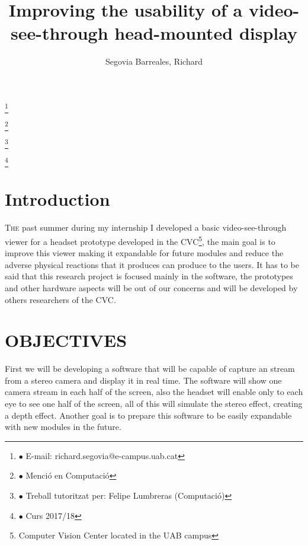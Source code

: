 \documentclass[10pt,a4paper,twocolumn,twoside]{article}
\author{\LARGE\sffamily Segovia Barreales, Richard}
\title{\Huge{\sffamily Improving the usability of a video-see-through head-mounted display}}
\date{}
\newcommand\blfootnote[1]{%
  \begingroup
  \renewcommand\thefootnote{}\footnote{#1}%
  \addtocounter{footnote}{-1}%
  \endgroup
}
\begin{document}
\fancyhead[RO]{\thepage}
\fancyhead[LE]{\thepage}

\fancyfoot[CO,CE]{}

{
   \fancyhf{}
}

\renewcommand{\headrulewidth}{0pt}
\renewcommand{\footrulewidth}{0pt}
\pagestyle{fancy}

\maketitle

\thispagestyle{primerapagina}


\blfootnote{$\bullet$ E-mail: richard.segovia@e-campus.uab.cat}
\blfootnote{$\bullet$ Menció en Computació}
\blfootnote{$\bullet$ Treball tutoritzat per: Felipe Lumbreras (Computació)}
\blfootnote{$\bullet$ Curs 2017/18}

\section{Introduction}

\lettrine[lines=3]{T}{he} past summer during my internship I developed a basic video-see-through viewer for a headset prototype developed in the CVC\footnote{Computer Vision Center located in the UAB campus}, the main goal is to improve this viewer making it expandable for future modules and reduce the adverse physical reactions that it produces can produce to the users\cite{disconfortReview}. It has to be said that this research project is focused mainly in the software, the prototypes and other hardware aspects will be out of our concerns and will be developed by others researchers of the CVC.

\bigskip

\section{OBJECTIVES}

First we will be developing a software that will be capable of capture an stream from a stereo camera and display it in real time. The software will show one camera stream in each half of the screen, also the headset will enable only to each eye to see one half of the screen, all of this will simulate the stereo effect, creating a depth effect. Another goal is to prepare this software to be easily expandable with new modules in the future.
\end{document}
